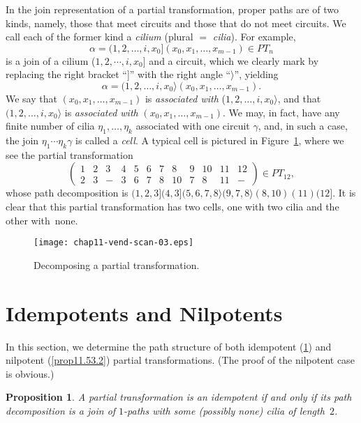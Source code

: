 \documentclass{surv-l}
\numberwithin{equation}{section}
\numberwithin{table}{section}
\numberwithin{figure}{section}
\theoremstyle{plain}
\newtheorem{proposition}[equation]{Proposition}
\theoremstyle{definition}
\begin{document}
In the join representation of a partial transformation, proper
paths are of two kinds, namely, those that meet circuits and those
that do not meet circuits. We call each of the former kind a
\emph{cilium} (plural $=$
\emph{cilia}). For example,
\[
\alpha=(1,2,\ldots, i, x_{0}](x_{0}, x_{1},\ldots, x_{m-1})\in PT_{n}
\]
is a join of a cilium ($1,2,\cdots, i, x_{0}]$ and a circuit,
which we clearly mark by replacing the right bracket ``]'' with
the right angle ``$\rangle$'', yielding
\[
\alpha=(1,2,\ldots, i, x_{0}\rangle(x_{0}, x_{1},\ldots, x_{m-1}).
\]
We say that $(x_{0}, x_{1},\ldots, x_{m-1})$ is \emph{associated
with} ($1, 2,\ldots, i, x_{0}\rangle$, and that $(1, 2,\ldots, i,
x_{0}\rangle$ is \emph{associated with} $(x_{0}, x_{1},\ldots,
x_{m-1})$. We may, in fact, have any finite number of cilia
$\eta_{1},\ldots, \eta_{k}$ associated with one circuit $\gamma$,
and, in such a case, the join $\eta_{1}\cdots\eta_{k}\gamma$ is
called a \emph{cell}. A typical cell is pictured in
Figure~\ref{fig11.52.1}, where we see the partial transformation
\[
\left(\begin{array}{cccccccccccc}
1 & 2 & 3 & 4 & 5 & 6 & 7 & 8 & 9 & 10 & 11 & 12\\
2 & 3 & - & 3 & 6 & 7 & 8 & 10 & 7 & 8 & 11 & -
\end{array}\right)\in PT_{12},
\]
whose path decomposition is $(1,
2,3](4,3](5,6,7,8\rangle(9,7,8\rangle(8,10)(11)(12]$. It is clear
that this partial transformation has two cells, one with two cilia
and the other with~none.

\begin{figure}[!h]
\texttt{[image: chap11-vend-scan-03.eps]}
\caption{Decomposing a partial transformation.}\label{fig11.52.1}
\end{figure}

\section{Idempotents and Nilpotents}\label{sec11.53}

In this section, we determine the path structure of both
idempotent (\ref{prop11.53.1}) and nilpotent (\ref{prop11.53.2})
partial transformations. (The proof of the nilpotent case is
obvious.)

\begin{proposition}\label{prop11.53.1}
A partial transformation is an idempotent if and only if its path
decomposition is a join of $1$-paths with some (possibly none) cilia
of length~$2$.
\end{proposition}
\end{document}
